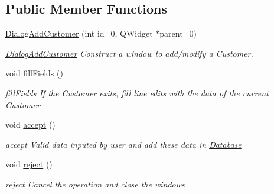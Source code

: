 \subsection*{Public Member Functions}
\begin{DoxyCompactItemize}
\item 
\hyperlink{classGui_1_1Dialogs_1_1DialogAddCustomer_a7ac689e5bcf3c4e28426016b5a2f1478}{Dialog\+Add\+Customer} (int id=0, Q\+Widget $\ast$parent=0)
\begin{DoxyCompactList}\small\item\em \hyperlink{classGui_1_1Dialogs_1_1DialogAddCustomer}{Dialog\+Add\+Customer} Construct a window to add/modify a Customer. \end{DoxyCompactList}\item 
\hypertarget{classGui_1_1Dialogs_1_1DialogAddCustomer_a25d53880ea053c960ee621fec29afb36}{void \hyperlink{classGui_1_1Dialogs_1_1DialogAddCustomer_a25d53880ea053c960ee621fec29afb36}{fill\+Fields} ()}\label{classGui_1_1Dialogs_1_1DialogAddCustomer_a25d53880ea053c960ee621fec29afb36}

\begin{DoxyCompactList}\small\item\em fill\+Fields If the Customer exits, fill line edits with the data of the current Customer \end{DoxyCompactList}\item 
\hypertarget{classGui_1_1Dialogs_1_1DialogAddCustomer_ab9f488af3fdfbf0ca9851cc59946dd5d}{void \hyperlink{classGui_1_1Dialogs_1_1DialogAddCustomer_ab9f488af3fdfbf0ca9851cc59946dd5d}{accept} ()}\label{classGui_1_1Dialogs_1_1DialogAddCustomer_ab9f488af3fdfbf0ca9851cc59946dd5d}

\begin{DoxyCompactList}\small\item\em accept Valid data inputed by user and add these data in \hyperlink{namespaceDatabase}{Database} \end{DoxyCompactList}\item 
\hypertarget{classGui_1_1Dialogs_1_1DialogAddCustomer_a5f3b96e858dedc8a54ff184baafd6e90}{void \hyperlink{classGui_1_1Dialogs_1_1DialogAddCustomer_a5f3b96e858dedc8a54ff184baafd6e90}{reject} ()}\label{classGui_1_1Dialogs_1_1DialogAddCustomer_a5f3b96e858dedc8a54ff184baafd6e90}

\begin{DoxyCompactList}\small\item\em reject Cancel the operation and close the windows \end{DoxyCompactList}\end{DoxyCompactItemize}


